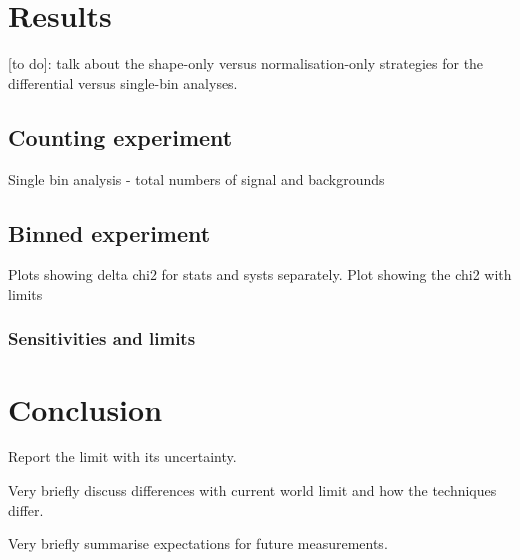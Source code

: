 \documentclass[12pt]{article}
\begin{document}
\section{Results}
[to do]: talk about the shape-only versus normalisation-only strategies for the differential versus single-bin analyses.

\subsection{Counting experiment}
Single bin analysis - total numbers of signal and backgrounds
\subsection{Binned experiment}
Plots showing delta chi2 for stats and systs separately. Plot showing the chi2 with limits
\subsubsection{Sensitivities and limits}

\section{Conclusion}
Report the limit with its uncertainty.

Very briefly discuss differences with current world limit and how the techniques differ.

Very briefly summarise expectations for future measurements.



\end{document}
